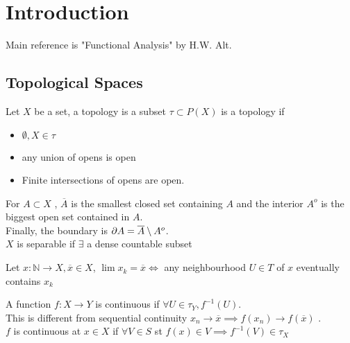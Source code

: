\documentclass[../main.tex]{subfiles}
\begin{document}
\section{Introduction}

Main reference is "Functional Analysis" by H.W. Alt.
\subsection{Topological Spaces}
\begin{defn}
	Let $X$ be a set, a topology is a subset $\tau \subset P( X) $ is a topology if
	\begin{itemize}
		\item $\emptyset, X \in \tau$ 
		\item any union of opens is open
		\item Finite intersections of opens are open.
	\end{itemize}
\end{defn}
\begin{defn}[Properties]
	For $A \subset X$ , $ \overline A$ is the smallest closed set containing $A$ and the interior $A^{o}$  is the biggest open set contained in $A$.\\
	Finally, the boundary is $\partial A = \overline A \setminus A^{o}$.\\
	$X$ is separable if $\exists $ a dense countable subset
\end{defn}
\begin{defn}[Sequences]
	Let $x: \mathbb{N}\to X, \overline{x}\in X$, $\lim x_k = \overline x \iff $ any neighbourhood $U \in T$ of $x$ eventually contains $x_k$ 
\end{defn}
\begin{defn}[Continuity]
A function $f:X\to Y$ is continuous if $\forall U \in \tau_Y, f^{-1}( U) $.\\
This is different from sequential continuity $x_n \to \overline{x} \implies f( x_n) \to f( \overline{x})  $ .\\
$f$ is continuous at $x\in X$ if $\forall V \in S$ st $f( x) \in V \implies f^{-1}( V) \in \tau_X$ 
\end{defn}
\end{document}
